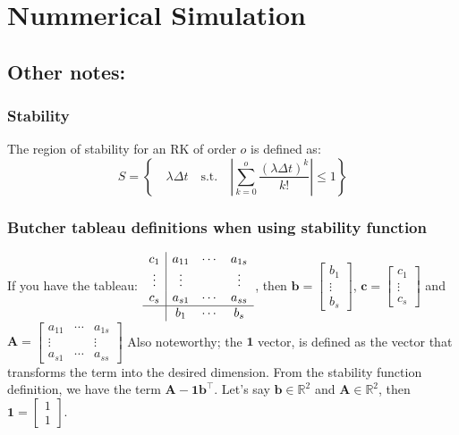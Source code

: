 \section{Nummerical Simulation}
\begin{figure}[H]
    \centering
    
\end{figure}
\newpage
\begin{figure}[H]
    \centering
    
\end{figure}
\newpage
\subsection{Other notes: }
\subsubsection{Stability}
The region of stability for an RK of order $o$ is defined as: 
\begin{equation}
    S = \left\{\quad \lambda \Delta t \quad \text{s.t.} \quad \left\lvert \sum_{k=0}^{o} \frac{(\lambda \Delta t)^k}{k!}\right\rvert \leq 1 \right\} 
\end{equation}
\subsubsection{Butcher tableau definitions when using stability function}
If you have the tableau: $
    \begin{array}{c|ccc}
    c_1 & a_{11} & \cdots & a_{1s} \\
    \vdots & \vdots & & \vdots \\
    c_s & a_{s1} & \cdots & a_{ss} \\
    \hline
    & b_1 & \cdots & b_s \\
    \end{array}$, then $\mathbf{b} = \begin{bmatrix}b_1 \\ \vdots \\ b_s\end{bmatrix}$, $\mathbf{c} = \begin{bmatrix}c_1 \\ \vdots \\ c_s\end{bmatrix}$ and $\mathbf{A} = \begin{bmatrix}a_{11} & \cdots & a_{1s} \\ \vdots & & \vdots \\ a_{s1} & \cdots & a_{ss}\end{bmatrix}$ \newline
Also noteworthy; the $\mathbf{1}$ vector, is defined as the vector that transforms the term into the desired dimension. From the stability function definition, we have the term $\mathbf{A}-\mathbf{1}\mathbf{b}^\top$. Let's say $\mathbf{b} \in \mathbb{R}^2$ and $\mathbf{A} \in \mathbb{R}^2$, then $\mathbf{1} = \begin{bmatrix}1 \\ 1\end{bmatrix}$.

